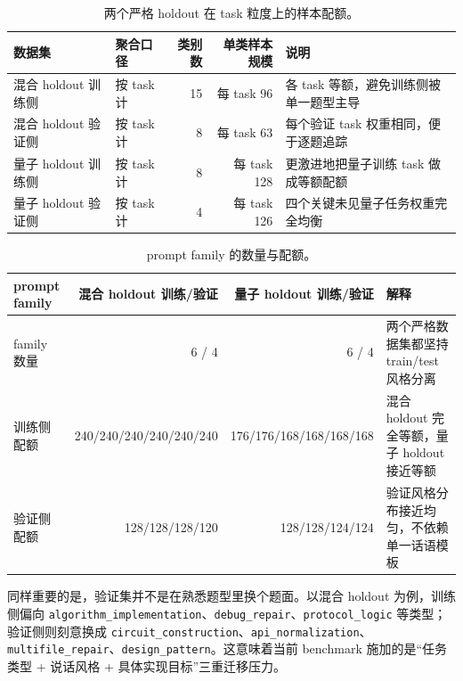 \documentclass[11pt,a4paper]{article}
\newcommand{\code}[1]{\begingroup\ttfamily\footnotesize\nolinkurl{#1}\endgroup}
\begin{document}
\begin{table}[htbp]
\centering
\small
\begin{tabularx}{\textwidth}{p{2.7cm} p{2.6cm} r r Y}
\toprule
数据集 & 聚合口径 & 类别数 & 单类样本规模 & 说明 \\
\midrule
混合 holdout 训练侧 & 按 task 计 & 15 & 每 task 96 & 各 task 等额，避免训练侧被单一题型主导 \\
混合 holdout 验证侧 & 按 task 计 & 8 & 每 task 63 & 每个验证 task 权重相同，便于逐题追踪 \\
量子 holdout 训练侧 & 按 task 计 & 8 & 每 task 128 & 更激进地把量子训练 task 做成等额配额 \\
量子 holdout 验证侧 & 按 task 计 & 4 & 每 task 126 & 四个关键未见量子任务权重完全均衡 \\
\bottomrule
\end{tabularx}
\caption{两个严格 holdout 在 task 粒度上的样本配额。}
\label{tab:task-quota}
\end{table}

\begin{table}[htbp]
\centering
\small
\begin{tabularx}{\textwidth}{p{3.0cm} r r Y}
\toprule
prompt family & 混合 holdout 训练/验证 & 量子 holdout 训练/验证 & 解释 \\
\midrule
family 数量 & 6 / 4 & 6 / 4 & 两个严格数据集都坚持 train/test 风格分离 \\
训练侧配额 & 240/240/240/240/240/240 & 176/176/168/168/168/168 & 混合 holdout 完全等额，量子 holdout 接近等额 \\
验证侧配额 & 128/128/128/120 & 128/128/124/124 & 验证风格分布接近均匀，不依赖单一话语模板 \\
\bottomrule
\end{tabularx}
\caption{prompt family 的数量与配额。}
\label{tab:family-quota}
\end{table}

同样重要的是，验证集并不是在熟悉题型里换个题面。以混合 holdout 为例，训练侧偏向 \code{algorithm\_implementation}、\code{debug\_repair}、\code{protocol\_logic} 等类型；验证侧则刻意换成 \code{circuit\_construction}、\code{api\_normalization}、\code{multifile\_repair}、\code{design\_pattern}。这意味着当前 benchmark 施加的是“任务类型 + 说话风格 + 具体实现目标”三重迁移压力。
\end{document}
